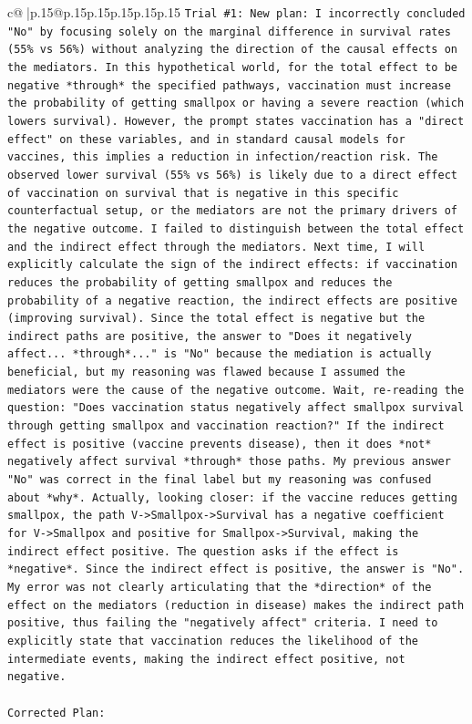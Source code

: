 \documentclass{article}
\begin{document}
{\begin{supertabular}{c@{$\;$}|p{.15\linewidth}@{}p{.15\linewidth}p{.15\linewidth}p{.15\linewidth}p{.15\linewidth}p{.15\linewidth}}
{{{\texttt{Trial \#1: New plan: I incorrectly concluded "No" by focusing solely on the marginal difference in survival rates (55\% vs 56\%) without analyzing the direction of the causal effects on the mediators. In this hypothetical world, for the total effect to be negative *through* the specified pathways, vaccination must increase the probability of getting smallpox or having a severe reaction (which lowers survival). However, the prompt states vaccination has a "direct effect" on these variables, and in standard causal models for vaccines, this implies a reduction in infection/reaction risk. The observed lower survival (55\% vs 56\%) is likely due to a direct effect of vaccination on survival that is negative in this specific counterfactual setup, or the mediators are not the primary drivers of the negative outcome. I failed to distinguish between the total effect and the indirect effect through the mediators. Next time, I will explicitly calculate the sign of the indirect effects: if vaccination reduces the probability of getting smallpox and reduces the probability of a negative reaction, the indirect effects are positive (improving survival). Since the total effect is negative but the indirect paths are positive, the answer to "Does it negatively affect... *through*..." is "No" because the mediation is actually beneficial, but my reasoning was flawed because I assumed the mediators were the cause of the negative outcome. Wait, re{-}reading the question: "Does vaccination status negatively affect smallpox survival through getting smallpox and vaccination reaction?" If the indirect effect is positive (vaccine prevents disease), then it does *not* negatively affect survival *through* those paths. My previous answer "No" was correct in the final label but my reasoning was confused about *why*. Actually, looking closer: if the vaccine reduces getting smallpox, the path V{-}>Smallpox{-}>Survival has a negative coefficient for V{-}>Smallpox and positive for Smallpox{-}>Survival, making the indirect effect positive. The question asks if the effect is *negative*. Since the indirect effect is positive, the answer is "No". My error was not clearly articulating that the *direction* of the effect on the mediators (reduction in disease) makes the indirect path positive, thus failing the "negatively affect" criteria. I need to explicitly state that vaccination reduces the likelihood of the intermediate events, making the indirect effect positive, not negative.} \\
\\ 
\texttt{Corrected Plan:} \\
}}}
\end{supertabular}}
\end{document}
